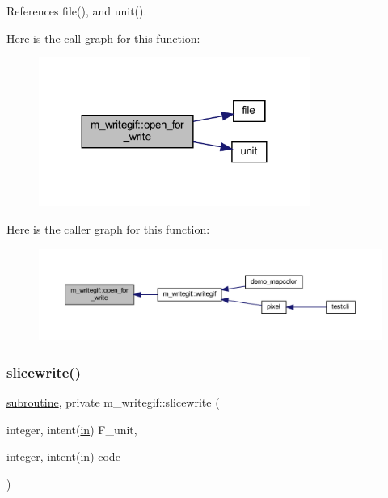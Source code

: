 References file(), and unit().

Here is the call graph for this function\+:
\nopagebreak
\begin{figure}[H]
\begin{center}
\leavevmode
\includegraphics[width=251pt]{namespacem__writegif_adb045213dd61508ad7dc7e5640fde67d_cgraph}
\end{center}
\end{figure}
Here is the caller graph for this function\+:
\nopagebreak
\begin{figure}[H]
\begin{center}
\leavevmode
\includegraphics[width=350pt]{namespacem__writegif_adb045213dd61508ad7dc7e5640fde67d_icgraph}
\end{center}
\end{figure}
\mbox{\label{namespacem__writegif_a27e0ec2c6e05428641179bf35762adb7}} 
\subsubsection{\texorpdfstring{slicewrite()}{slicewrite()}}
{\footnotesize\ttfamily \hyperlink{M__stopwatch_83_8txt_acfbcff50169d691ff02d4a123ed70482}{subroutine}, private m\+\_\+writegif\+::slicewrite (\begin{DoxyParamCaption}\item[{integer, intent(\hyperlink{M__journal_83_8txt_afce72651d1eed785a2132bee863b2f38}{in})}]{F\+\_\+unit,  }\item[{integer, intent(\hyperlink{M__journal_83_8txt_afce72651d1eed785a2132bee863b2f38}{in})}]{code }\end{DoxyParamCaption})\hspace{0.3cm}{\ttfamily [private]}}



